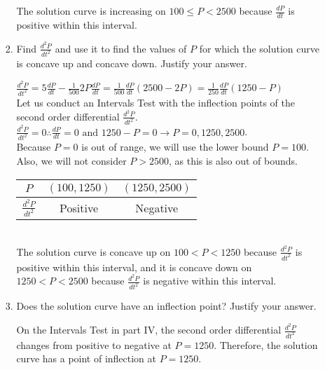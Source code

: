 \documentclass[10pt,letterpaper]{report}
\begin{document}
\begin{enumerate}
\begin{enumerate}
\begin{enumerate}
        The solution curve is increasing on $100\leq P< 2500$ because $\frac{dP}{dt}$ is positive within this interval. \\
        
      \item{Find $\frac{d^{2}P}{dt^{2}}$ and use it to find the values of $P$ for which the solution curve is concave up and concave down. Justify your answer. \\}
      
        $\frac{d^{2}P}{dt^{2}}=5\frac{dP}{dt}-\frac{1}{500}2P\frac{dP}{dt}=\frac{1}{500}\frac{dP}{dt}\left(2500-2P\right)=\frac{1}{250}\frac{dP}{dt}\left(1250-P\right)$ \\
        
        Let us conduct an Intervals Test with the inflection points of the second order differential $\frac{d^{2}P}{dt^{2}}$. \\
        
        $\frac{d^{2}P}{dt^{2}}=0\therefore \frac{dP}{dt}=0 \text{ and } 1250-P=0\rightarrow P=0, 1250, 2500$. \\
        
        Because $P=0$ is out of range, we will use the lower bound $P=100$. Also, we will not consider $P>2500$, as this is also out of bounds. 
        
        \begin{center}
          \begin{tabular}{| c | c | c |}
            \hline
            $P$ & $(100, 1250)$ & $(1250, 2500)$ \\
            \hline
            $\frac{d^{2}P}{dt^{2}}$ & Positive & Negative \\
            \hline
          \end{tabular}
        \end{center} \\
        
        The solution curve is concave up on $100<P<1250$ because $\frac{d^{2}P}{dt^{2}}$ is positive within this interval, and it is concave down on $1250<P<2500$ because $\frac{d^{2}P}{dt^{2}}$ is negative within this interval. \\
        
      \item{Does the solution curve have an inflection point? Justify your answer. \\}
      
        On the Intervals Test in part IV, the second order differential $\frac{d^{2}P}{dt^{2}}$ changes from positive to negative at $P=1250$. Therefore, the solution curve has a point of inflection at $P=1250. $ \\
      

\end{enumerate}
\end{enumerate}
\end{enumerate}
\end{document}
